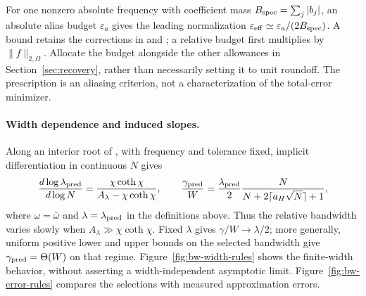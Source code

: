 For one nonzero absolute frequency with coefficient mass
$B_{\rm spec}=\sum_j|b_j|$, an absolute alias budget $\varepsilon_a$ gives
the leading normalization $\varepsilon_{\rm eff}\simeq
\varepsilon_a/(2B_{\rm spec})$. A bound retains the corrections in
 and
; a relative budget first multiplies by
$\|f\|_{2,\Omega}$. Allocate the budget alongside the other allowances in
Section~\ref{sec:recovery}, rather than necessarily setting it to unit
roundoff. The prescription is an aliasing criterion, not a characterization
of the total-error minimizer.

\paragraph{Width dependence and induced slopes.}
Along an interior root of , with frequency
and tolerance fixed, implicit differentiation in continuous $N$ gives
\begin{equation}
 \frac{d\log\lambda_{\rm pred}}{d\log N}
 =\frac{\chi\coth\chi}{A_\lambda-\chi\coth\chi},
 \qquad
 \frac{\gamma_{\rm pred}}W
 =\frac{\lambda_{\rm pred}}2
   \frac{N}{N+2\lceil a_H\sqrt N\rceil+1},
 \label{eq:bandwidth-slope-scaling}
\end{equation}
where $\omega=\bar\omega$ and $\lambda=\lambda_{\rm pred}$ in the
definitions above. Thus the relative bandwidth varies
slowly when $A_\lambda\gg\chi\coth\chi$. Fixed $\lambda$ gives
$\gamma/W\to\lambda/2$; more generally, uniform positive lower and upper
bounds on the selected bandwidth give $\gamma_{\rm pred}=\Theta(W)$ on
that regime. Figure~\ref{fig:bw-width-rules} shows the finite-width behavior,
without asserting a width-independent asymptotic limit.
Figure~\ref{fig:bw-error-rules} compares the selections
with measured approximation errors.

